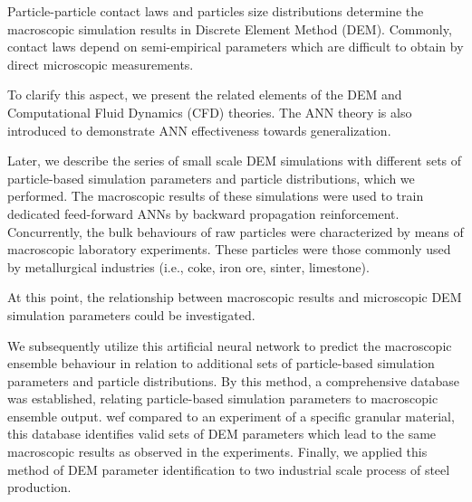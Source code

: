 Particle-particle contact laws and particles size distributions determine the
macroscopic simulation results in Discrete Element Method (DEM). 
Commonly, contact laws depend on semi-empirical parameters which 
are difficult to obtain by direct microscopic measurements. 

To clarify this aspect, we present the related elements of the DEM
and Computational Fluid Dynamics (CFD) theories.
The ANN theory is also introduced to demonstrate ANN effectiveness towards
generalization.

Later, we describe the series of small scale DEM simulations with different sets
of particle-based simulation parameters and particle distributions, which we
performed.
The macroscopic results of these simulations were used to train dedicated
feed-forward ANNs by backward propagation reinforcement.
Concurrently, the bulk behaviours of raw particles were characterized by means
of macroscopic laboratory experiments. These particles were those commonly used
by metallurgical industries (i.e., coke, iron ore, sinter, limestone).

At this point, the relationship between macroscopic results and microscopic DEM
simulation parameters could be investigated.

We subsequently utilize this artificial neural network to predict the macroscopic 
ensemble behaviour in relation to additional sets of particle-based simulation parameters and particle distributions. 
By this method, a comprehensive database was established, relating particle-based 
simulation parameters to macroscopic ensemble output.
wef compared to an experiment of a specific granular material, this database identifies 
valid sets of DEM parameters which lead to the same macroscopic results as observed in the experiments.
Finally, we applied this method of DEM parameter identification to two industrial
scale process of steel production.




\endgroup			

\vfill

%
